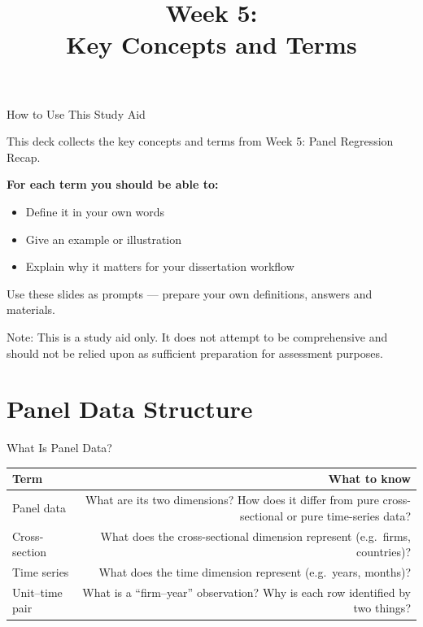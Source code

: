 \documentclass[9pt,aspectratio=169]{beamer}
\title{\LARGE \textnormal{Week 5: \\
Key Concepts and Terms}}
\begin{document}
\begin{frame}[plain]
\titlepage
\end{frame}


\begin{frame}{How to Use This Study Aid}

This deck collects the \alert{key concepts and terms} from Week 5: Panel Regression Recap.

\medskip

\textbf{For each term you should be able to:}
\begin{itemize}
    \item Define it in your own words
    \item Give an example or illustration
    \item Explain why it matters for your dissertation workflow
\end{itemize}

\medskip

Use these slides as prompts --- prepare your own definitions, answers and materials.

\medskip

\alert{Note:} This is a study aid only. It does not attempt to be comprehensive and should not be relied upon as sufficient preparation for assessment purposes.

\end{frame}


\section{Panel Data Structure}

\begin{frame}{What Is Panel Data?}

\begin{tabular}{@{}lR@{}}
\toprule
\textbf{Term} & \textbf{What to know} \\
\midrule
\alert{Panel data} & What are its two dimensions? How does it differ from pure cross-sectional or pure time-series data? \\[0.8em]
\alert{Cross-section} & What does the cross-sectional dimension represent (e.g.\ firms, countries)? \\[0.8em]
\alert{Time series} & What does the time dimension represent (e.g.\ years, months)? \\[0.8em]
\alert{Unit--time pair} & What is a ``firm--year'' observation? Why is each row identified by two things? \\
\bottomrule
\end{tabular}

\end{frame}
\end{document}
